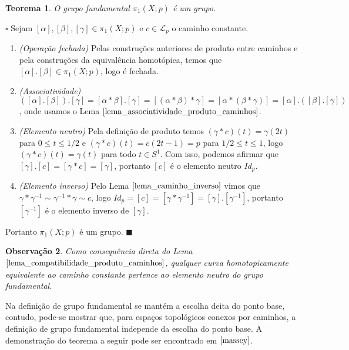 \documentclass[12pt]{book}
\newtheorem{teorema}{Teorema}[section]
\newtheorem{observacao}[teorema]{Observação}
\newenvironment{prova}[1]{$\square$ #1}{\hfill$\blacksquare$}
\newcommand{\caminhos}{\mathcal{L}}
\newcommand{\caminhospontobase}[1]{\caminhos_{#1}}
\newcommand{\circulo}{S^{1}}
\newcommand{\classe}[1]{[#1]}
\newcommand{\grupofundamentalpontobase}[2]{\pi_{1}(#1; #2)}
\begin{document}
	\begin{teorema}
		O grupo fundamental $\grupofundamentalpontobase{X}{p}$ é um grupo.
	\end{teorema}
	\begin{prova}
		Sejam $\classe{\alpha}, \classe{\beta}, \classe{\gamma} \in  \grupofundamentalpontobase{X}{p}$ e $c\in \caminhospontobase{p}$ o caminho constante.
		\begin{enumerate}
			\item \textit{(Operação fechada)} Pelas construções anteriores de produto entre caminhos e pela construções da equivalência homotópica, temos que $\classe{\alpha}.\classe{\beta} \in \grupofundamentalpontobase{X}{p}$, logo é fechada.
			\item \textit{(Associatividade)} $(\classe{\alpha}. \classe{\beta}). \classe{\gamma} = \classe{\alpha*\beta}. \classe{\gamma} = \classe{(\alpha*\beta)*\gamma} = \classe{\alpha*(\beta*\gamma)} = \classe{\alpha}. (\classe{\beta}. \classe{\gamma} )$, onde usamos o Lema $\ref{lema_associatividade_produto_caminhos}$.
			\item \textit{(Elemento neutro)} Pela definição de produto temos $(\gamma*c)(t) = \gamma(2t)$ para $0\leq t \leq 1/2$ e  $(\gamma*c)(t) = c(2t-1) = p$ para $1/2 \leq t \leq 1$, logo $(\gamma*c)(t) = \gamma(t)$ para todo $t \in \circulo$. Com isso, podemos afirmar que $\classe{\gamma}.\classe{c} = \classe{\gamma*c} = \classe{\gamma}$, portanto $\classe{c}$ é o elemento neutro $Id_{p}$.
			\item \textit{(Elemento inverso)} Pelo Lema $\ref{lema_caminho_inverso}$ vimos que $\gamma *\gamma^{-1} \sim \gamma^{-1} *\gamma \sim c$, logo $Id_{p} =\classe{c} =  \classe{\gamma*\gamma^{-1}} = \classe{\gamma}.\classe{\gamma^{-1}}$, portanto $\classe{\gamma^{-1}}$ é o elemento inverso de $\classe{\gamma}$.
		\end{enumerate}
		Portanto $\grupofundamentalpontobase{X}{p}$ é um grupo.
	\end{prova}
	
	
	\begin{observacao}
		Como consequência direta do Lema $\ref{lema_compatibilidade_produto_caminhos}$, qualquer curva homotopicamente equivalente ao caminho constante pertence ao elemento neutro do grupo fundamental.
	\end{observacao}
	
	Na definição de grupo fundamental se mantém a escolha deita do ponto base, contudo, pode-se mostrar que, para espaços topológicos conexos por caminhos, a definição de grupo fundamental independe da escolha do ponto base. A demonstração do teorema a seguir pode ser encontrado em $\cite{massey}$.
	
\end{document}
